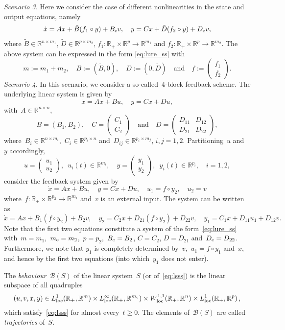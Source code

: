 \documentclass[a4paper,11pt]{article}
\newcommand{\R}{\mathbb R}
\newcommand{\sB}{{\mathcal B}}
\numberwithin{equation}{section}
\numberwithin{figure}{section}
\numberwithin{table}{section}
\begin{document}
{\it Scenario 3.} Here we consider the case of different nonlinearities in the state and output equations, namely
\[
\dot x = Ax + \tilde B(f_1\circ y)+B_{\rm e}v, \quad y= Cx+\tilde D(f_2\circ y)+D_{\rm e}v,
\]
where $\tilde B\in\R^{n\times m_1}$, $\tilde D\in\R^{p\times m_2}$, $f_1:\R_+\times\R^p\to\R^{m_1}$
and $f_2:\R_+\times\R^p\to\R^{m_2}$. The above system can be expressed in the form \eqref{eq:lure_ss}
with
\[
m:=m_1+m_2,\quad B:=(\tilde B,0),\quad D:=(0,\tilde D)\quad\mbox{and}\quad f:=\begin{pmatrix} f_1\\ f_2\end{pmatrix}.
\]
%
{\it Scenario 4.} In this scenario, we consider a so-called~$4$-block feedback scheme.
The underlying linear system is given by
\[
\dot x = Ax + Bu, \quad y= Cx+Du,
\]
with~$A\in\R^{n\times n}$,
\[
B=(B_1,B_2),\quad
C=\begin{pmatrix} C_1\\ C_2\end{pmatrix}\quad\mbox{and}\quad
D=\begin{pmatrix} D_{11} & D_{12}\\ D_{21} & D_{22}\end{pmatrix},
\]
where~$B_i\in\R^{n\times m_i}$,~$C_i\in\R^{p_i\times n}$ and~$D_{ij}\in\R^{p_i\times m_j}$,
$i,j=1,2$. Partitioning~$u$ and~$y$ accordingly,
\[
u=\begin{pmatrix} u_1\\ u_2\end{pmatrix},\,\,\, u_i(t)\in\R^{m_i},\quad
y=\begin{pmatrix} y_1\\ y_2\end{pmatrix},\,\,\, y_i(t)\in\R^{p_i},\quad i=1,2,
\]
consider the feedback system given by
\[
\dot x = Ax + Bu, \quad y= Cx+Du,\quad u_1=f\circ y_2,\quad u_2=v
\]
where~$f:\R_+\times\R^{p_2}\to\R^{m_1}$ and~$v$ is an external input. The system can be written as
\[
\dot x = Ax + B_1(f\circ y_2)+B_2v,\quad y_2= C_2x+D_{21}(f\circ y_2)+D_{22}v,\quad
y_1=C_1x+D_{11}u_1+D_{12}v.
\]
Note that the first two equations constitute a system of the form~\eqref{eq:lure_ss} with~$m=m_1$,~$m_{\rm e}=m_2$,~$p=p_2$,~$B_{\rm e}=B_2$, $C=C_2$, $D=D_{21}$ and~$D_{\rm e}=D_{22}$. Furthermore, we note that $y_1$ is completely determined by~$v$,~$u_1=f\circ y_1$ and~$x$, and hence by the first two equations (into which~$y_1$ does not enter).

The {\it behaviour}~$\sB(S)$ of the linear system~$S$ (or of~\eqref{eq:lsss}) is the linear subspace of all quadruples
\[
(u,v,x,y)\in L^1_{\rm loc}(\R_+,\R^m)\times L^\infty_{\rm loc}(\R_+,\R^{m_{\rm e}})\times W^{1,1}_{\rm loc}
(\R_+,\R^n)\times L^1_{\rm loc}(\R_+,\R^p)\,,
\]
which satisfy~\eqref{eq:lsss} for almost every~$t\geq 0$. The elements of~$\sB(S)$ are
called {\it trajectories} of~$S$.
\end{document}
